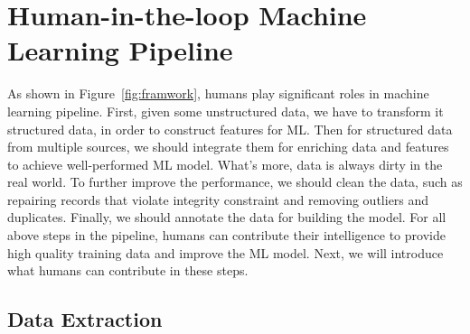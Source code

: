 \section{Human-in-the-loop Machine Learning Pipeline}
\label{sec:pipeline}

As shown in Figure~\ref{fig:framwork}, humans play significant roles in machine learning pipeline. First, given some unstructured data, we have to transform it structured data, in order to construct features for ML. Then for structured data from multiple sources, we should integrate them for enriching data and features to achieve  well-performed ML model. What's more, data is always dirty in the real world. To further improve the performance, we should clean the data, such as repairing records that violate integrity constraint  and  removing outliers and duplicates. Finally, we should annotate the data for building the model. For all above steps in the pipeline, humans can contribute their intelligence to provide high quality training data and improve the ML model. Next, we will introduce what humans can contribute in these steps.



\subsection{Data Extraction}

